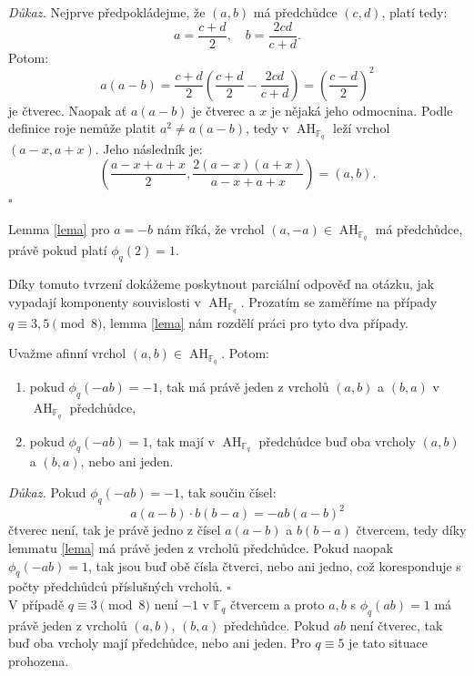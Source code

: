 \documentclass[12pt]{report}
\DeclareMathOperator{\AH}{AH}
\begin{document}
\noindent \textit{Důkaz.} Nejprve předpokládejme, že $(a,b)$ má předchůdce $(c,d)$, platí tedy:
\begin{equation*}
a = \frac{c+d}{2}, \quad b = \frac{2cd}{c+d}.
\end{equation*}
Potom:
\begin{equation*}
a(a-b) = \frac{c+d}{2} \left( \frac{c+d}{2} - \frac{2cd}{c+d} \right) =\left( \frac{c-d}{2}\right)^2
\end{equation*}
je čtverec. Naopak ať $a(a-b)$ je čtverec a $x$ je nějaká jeho odmocnina. Podle definice roje nemůže platit $a^2 \neq a(a-b)$, tedy v $\AH_{\mathbb{F}_q}$ leží vrchol $(a-x,a+x)$.  Jeho následník je: $$\left(\frac{a-x+a+x}{2}, \frac{2 (a-x)(a+x)}{a-x+a+x} \right)= \left(a, b \right).$$ \hfill $\square$\\

\begin{poznamka}
Lemma \ref{lema} pro $a=-b$ nám říká, že vrchol $(a,-a) \in \AH_{\mathbb{F}_q}$ má předchůdce, právě pokud platí $\phi_q(2) = 1$. 
\end{poznamka}

Díky tomuto tvrzení dokážeme poskytnout parciální odpověď na otázku, jak vypadají komponenty souvislosti v $\AH_{\mathbb{F}_q}$. Prozatím se zaměříme na případy $q \equiv 3,5 \pmod{8}$, lemma \ref{lema} nám rozdělí práci pro tyto dva případy.

\begin{dusledek}\label{dusl}
Uvažme afinní vrchol $(a,b) \in \AH_{\mathbb{F}_q}$. Potom:
\begin{enumerate}
\item pokud $\phi_q(-ab) = -1$, tak má právě jeden z vrcholů $(a,b)$ a $(b,a)$ v $\AH_{\mathbb{F}_q}$ předchůdce,
\item pokud $\phi_q(-ab) = 1$, tak mají v $\AH_{\mathbb{F}_q}$ předchůdce buď oba vrcholy $(a,b)$ a $(b,a)$, nebo ani jeden.
\end{enumerate}
\end{dusledek}
\noindent \textit{Důkaz.} Pokud $\phi_q(-ab) = -1$, tak součin čísel: $$a(a-b) \cdot b (b-a) = -ab(a-b)^2$$
čtverec není, tak je právě jedno z čísel $a(a-b)$ a $b(b-a)$ čtvercem, tedy díky lemmatu \ref{lema} má právě jeden z vrcholů předchůdce. Pokud naopak $\phi_q(-ab) =1$, tak jsou buď obě čísla čtverci, nebo ani jedno, což koresponduje s počty předchůdců příslušných vrcholů. \hfill $\square$\\

V případě $q \equiv 3 \pmod{8}$ není $-1$ v $\mathbb{F}_q$ čtvercem a proto $a,b$ s $\phi_q (ab) = 1$ má právě jeden z vrcholů $(a,b)$, $(b,a)$ předchůdce. Pokud $ab$ není čtverec, tak buď oba vrcholy mají předchůdce, nebo ani jeden. Pro $q \equiv 5$ je tato situace prohozena. 
\end{document}
